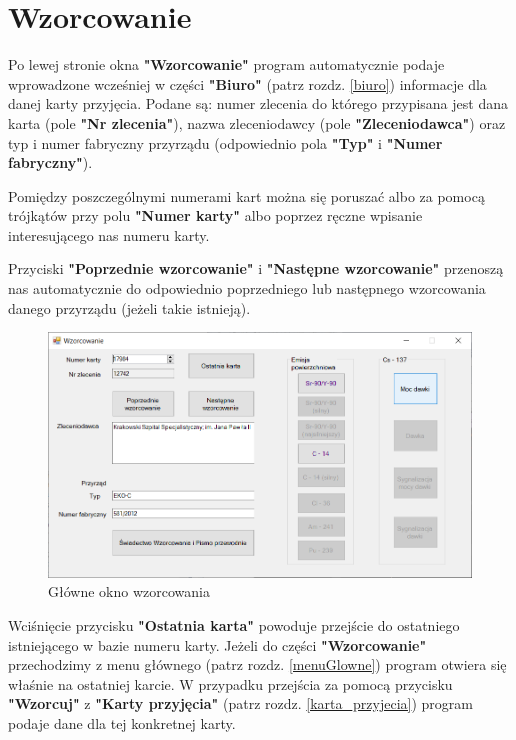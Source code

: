 
\rozdzial

\section{Wzorcowanie}
\label{wzorcowanie}

Po lewej stronie okna \textbf{"Wzorcowanie"} program automatycznie podaje wprowadzone wcześniej w części \textbf{"Biuro"} (patrz rozdz. \ref{biuro}) informacje dla danej karty przyjęcia. Podane są: numer zlecenia do którego przypisana jest dana karta (pole \textbf{"Nr zlecenia"}), nazwa zleceniodawcy (pole \textbf{"Zleceniodawca"}) oraz typ i numer fabryczny przyrządu (odpowiednio pola \textbf{"Typ"} i \textbf{"Numer fabryczny"}). 

Pomiędzy poszczególnymi numerami kart można się poruszać albo za pomocą trójkątów przy polu \textbf{"Numer karty"} albo poprzez ręczne wpisanie interesującego nas numeru karty.

Przyciski \textbf{"Poprzednie wzorcowanie"} i \textbf{"Następne wzorcowanie"} przenoszą nas automatycznie do odpowiednio poprzedniego lub następnego wzorcowania danego przyrządu (jeżeli takie istnieją).

\begin{figure}[htb]
	\centering
	\includegraphics[width=\columnwidth]{obrazki/Wzorcowanie/menu_wzorcowanie.png}
	\caption{Główne okno wzorcowania}
	\label{menuWzorcowanie}
\end{figure}

Wciśnięcie przycisku \textbf{"Ostatnia karta"} powoduje przejście do ostatniego istniejącego w bazie numeru karty. Jeżeli do części \textbf{"Wzorcowanie"} przechodzimy z menu głównego (patrz rozdz. \ref{menuGlowne}) program otwiera się właśnie na ostatniej karcie. W przypadku przejścia za pomocą przycisku \textbf{"Wzorcuj"} z \textbf{"Karty przyjęcia"} (patrz rozdz. \ref{karta_przyjecia}) program podaje dane dla tej konkretnej karty.

